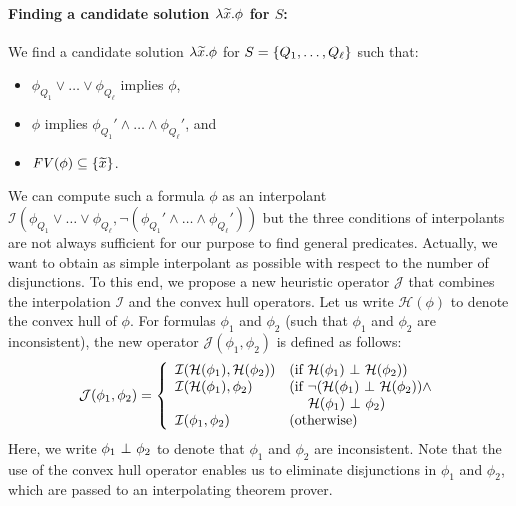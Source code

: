\paragraph{Finding a candidate solution \(\lambda \widetilde{x}.\phi\) for \(S\):}
We find a candidate solution \(\lambda \widetilde{x}.\phi\) for \(S =
\{{Q_1,\dots,Q_{\ell}}\}\) such that:
\begin{itemize}
\item \(\phi_{Q_1} \lor \dots \lor \phi_{Q_{\ell}}\) implies \(\phi\),
\item \(\phi\) implies \(\phi_{Q_1}' \land \dots \land \phi_{Q_{\ell}}'\), and
\item \(\mathit{FV}({\phi}) \subseteq \{{\widetilde{x}}\}\).
\end{itemize}
We can compute such a formula \(\phi\) as an interpolant
\(\mathcal{I}(\phi_{Q_1} \lor \dots \lor \phi_{Q_{\ell}},\neg
(\phi_{Q_1}' \land \dots \land \phi_{Q_{\ell}}'))\) but the three
conditions of interpolants are not always sufficient for our purpose to
find general predicates.  Actually, we want to obtain as simple
interpolant as possible with respect to the number of disjunctions.
To this end, we propose a new heuristic operator \(\mathcal{J}\) that
combines the interpolation \(\mathcal{I}\) and the convex hull operators.
 Let us write \(\mathcal{H}(\phi)\) to denote the convex hull of \(\phi\).
 For formulas \(\phi_1\) and \(\phi_2\) (such that \(\phi_1\) and
\(\phi_2\) are inconsistent), the new operator
\(\mathcal{J}(\phi_1,\phi_2)\) is defined as follows:
\begin{eqnarray*}
\mathcal{J}(\phi_1,\phi_2) =
\left\{
\begin{array}{ll}
\mathcal{I}(\mathcal{H}(\phi_1),\mathcal{H}(\phi_2)) & (\mbox{if~}\mathcal{H}(\phi_1) \ \bot\  \mathcal{H}(\phi_2)) \\
\mathcal{I}(\mathcal{H}(\phi_1),\phi_2) & (\mbox{if~}\neg (\mathcal{H}(\phi_1) \ \bot\  \mathcal{H}(\phi_2)) \land \\
&\ \quad \mathcal{H}(\phi_1) \ \bot\  \phi_2) \\
\mathcal{I}(\phi_1,\phi_2) & (\mbox{otherwise})
\end{array}
\right.
\end{eqnarray*}
Here, we write \(\phi_1 \ \bot\  \phi_2\) to denote that \(\phi_1\) and
\(\phi_2\) are inconsistent.  Note that the use of the convex hull
operator enables us to eliminate disjunctions in \(\phi_1\) and
\(\phi_2\), which are passed to an interpolating theorem prover.
